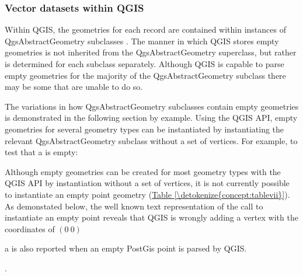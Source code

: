 \documentclass[letterpaper,11pt,english]{sphinxmanual}
\begin{document}
\subsubsection{Vector datasets within QGIS}
\label{\detokenize{concept:vector-datasets-within-qgis}}
Within QGIS, the geometries for each record are contained within instances of QgsAbstractGeometry subclasses .  The manner in which QGIS stores empty geometries is not inherited from the QgsAbstractGeometry superclass, but rather is determined for each subclass separately.  Although QGIS is capable to parse empty geometries for the majority of the QgsAbstractGeometry subclass there may be some that are unable to do so.

The variations in how QgsAbstractGeometry subclasses contain empty geometries is demonstrated in the following section by example.  Using the QGIS API, empty geometries for several geometry types can be instantiated by instantiating the relevant QgsAbstractGeometry subclass without a set of vertices.  For example, to test that a  is empty:

%
\begin{sphinxVerbatim}[commandchars=\\\{\}]
   
\end{sphinxVerbatim}

Although empty geometries can be created for most geometry types with the QGIS API by instantiation without a set of vertices, it is not currently possible to instantiate an empty point geometry (\hyperref[\detokenize{concept:tablevii}]{Table \ref{\detokenize{concept:tablevii}}}). As demonstated below, the well known text representation of the call to instantiate an empty point reveals that QGIS is wrongly adding a vertex with the coordinates of \((0\ 0)\)  %
\begin{footnote}[1]\sphinxAtStartFootnote
a  is also reported when an empty PostGis point is parsed by QGIS.
%
\end{footnote}.
\end{document}
